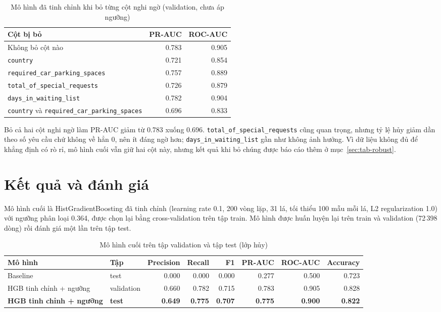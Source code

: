 \begin{table}[H]
\centering
\caption{Mô hình đã tinh chỉnh khi bỏ từng cột nghi ngờ (validation, chưa áp ngưỡng)}
\label{tab:tab-suspect}
\begin{tabular}{lrr}
\toprule
Cột bị bỏ & PR-AUC & ROC-AUC\\
\midrule
Không bỏ cột nào & 0.783 & 0.905\\
\texttt{country} & 0.721 & 0.854\\
\texttt{required\_car\_parking\_spaces} & 0.757 & 0.889\\
\texttt{total\_of\_special\_requests} & 0.726 & 0.879\\
\texttt{days\_in\_waiting\_list} & 0.782 & 0.904\\
\texttt{country} và \texttt{required\_car\_parking\_spaces} & 0.696 & 0.833\\
\bottomrule
\end{tabular}
\end{table}

Bỏ cả hai cột nghi ngờ làm PR-AUC giảm từ 0.783 xuống 0.696. \texttt{total\_of\_special\_requests} cũng quan trọng, nhưng tỷ lệ hủy
giảm dần theo số yêu cầu chứ không về hẳn 0, nên ít đáng ngờ hơn; \texttt{days\_in\_waiting\_list} gần như không ảnh hưởng.
Vì dữ liệu không đủ để khẳng định có rò rỉ, mô hình cuối vẫn giữ hai cột này, nhưng kết quả khi bỏ chúng được báo cáo thêm
ở mục~\ref{sec:tab-robust}.

\section{Kết quả và đánh giá}
Mô hình cuối là HistGradientBoosting đã tinh chỉnh (learning rate 0.1, 200 vòng lặp, 31 lá, tối thiểu 100 mẫu mỗi lá,
L2 regularization 1.0) với ngưỡng phân loại 0.364, được chọn lại bằng cross-validation trên tập train.
Mô hình được huấn luyện lại trên train và validation (72\,398 dòng) rồi đánh giá một lần trên tập test.

\begin{table}[H]
\centering
\caption{Mô hình cuối trên tập validation và tập test (lớp hủy)}
\label{tab:tab-results}
\small\setlength{\tabcolsep}{4pt}
\begin{tabular}{llrrrrrr}
\toprule
Mô hình & Tập & Precision & Recall & F1 & PR-AUC & ROC-AUC & Accuracy\\
\midrule
Baseline & test & 0.000 & 0.000 & 0.000 & 0.277 & 0.500 & 0.723\\
HGB tinh chỉnh + ngưỡng & validation & 0.660 & 0.782 & 0.715 & 0.783 & 0.905 & 0.828\\
\textbf{HGB tinh chỉnh + ngưỡng} & \textbf{test} & \textbf{0.649} & \textbf{0.775} & \textbf{0.707} & \textbf{0.775} & \textbf{0.900} & \textbf{0.822}\\
\bottomrule
\end{tabular}
\end{table}

